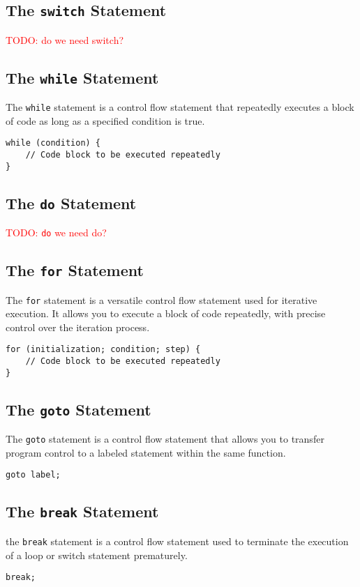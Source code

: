 \documentclass[11pt,A4]{article}
\newcommand{\todo}[1]{\textcolor{red}{#1}}
\begin{document}
        \subsection{The \texttt{switch} Statement}
        \todo{TODO: do we need switch?}
        
        \subsection{The \texttt{while} Statement}
        The \texttt{while} statement is a control flow statement that repeatedly executes a block of code as long as a specified condition is true.
        \begin{lstlisting}
while (condition) {
    // Code block to be executed repeatedly
}
        \end{lstlisting}
        
        \subsection{The \texttt{do} Statement}
        \todo{TODO: \texttt{do} we need do?}
        
        \subsection{The \texttt{for} Statement}
        The \texttt{for} statement is a versatile control flow statement used for iterative execution. It allows you to execute a block of code repeatedly, with precise control over the iteration process. 
        \begin{lstlisting}
for (initialization; condition; step) {
    // Code block to be executed repeatedly
}
        \end{lstlisting}
        
        \subsection{The \texttt{goto} Statement}
        The \texttt{goto} statement is a control flow statement that allows you to transfer program control to a labeled statement within the same function.
        \begin{lstlisting}
goto label;
        \end{lstlisting}
    
        \subsection{The \texttt{break} Statement}
        the \texttt{break} statement is a control flow statement used to terminate the execution of a loop or switch statement prematurely.
        \begin{lstlisting}
break;
        \end{lstlisting}
        
\end{document}
